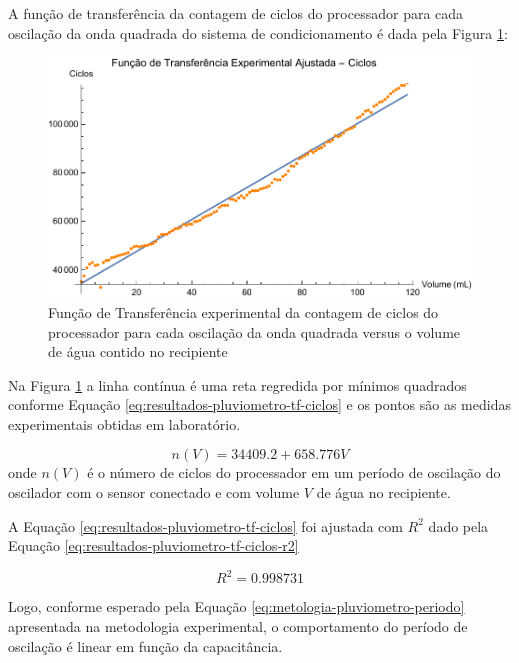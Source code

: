 \documentclass[a4paper]{instrumentacao}
\begin{document}
A função de transferência da contagem de ciclos do processador para cada oscilação da onda quadrada do sistema de condicionamento é dada pela Figura \ref{fig:resultados-pluviometro-tf-ciclos}:

\begin{figure}[H]
	\centering \includegraphics[width=\textwidth]{Nivel/Experimental/Ciclos-Ajuste.pdf}
	\caption{Função de Transferência experimental da contagem de ciclos do processador para cada oscilação da onda quadrada versus o volume de água contido no recipiente}
	\label{fig:resultados-pluviometro-tf-ciclos}
\end{figure}


Na Figura \ref{fig:resultados-pluviometro-tf-ciclos} a linha contínua é uma reta regredida por mínimos quadrados conforme Equação \ref{eq:resultados-pluviometro-tf-ciclos} e os pontos são as medidas experimentais obtidas em laboratório.

\begin{equation}
	n(V) = 34409.2 + 658.776 V
	\label{eq:resultados-pluviometro-tf-ciclos}
\end{equation}
\noindent onde $n(V)$ é o número de ciclos do processador em um período de oscilação do oscilador com o sensor conectado e com volume $V$ de água no recipiente.

A Equação \ref{eq:resultados-pluviometro-tf-ciclos} foi ajustada com $R^2$ dado pela Equação \ref{eq:resultados-pluviometro-tf-ciclos-r2} 

\begin{equation}
	R^2 = 0.998731
	\label{eq:resultados-pluviometro-tf-ciclos-r2}
\end{equation}

Logo, conforme esperado pela Equação \ref{eq:metologia-pluviometro-periodo} apresentada na metodologia experimental, o comportamento do período de oscilação é linear em função da capacitância.
\end{document}
